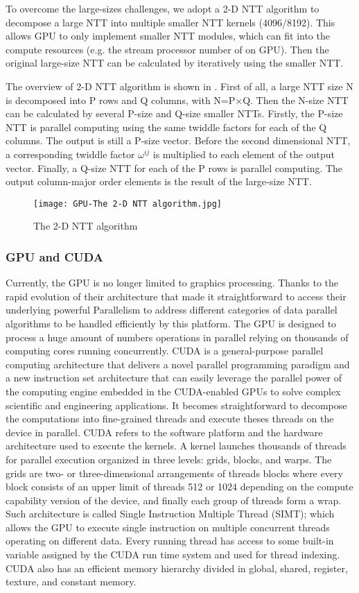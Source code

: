 To overcome the large-sizes challenges, we adopt a 2-D NTT algorithm to decompose a large NTT into multiple smaller NTT kernels (4096/8192). This allows GPU to only implement smaller NTT modules, which can fit into the compute resources (e.g. the stream processor number of on GPU). Then the original large-size NTT can be calculated by iteratively using the smaller NTT.

The overview of 2-D NTT algorithm is shown in . First of all, a large NTT size N is decomposed into P rows and Q columns, with N=P×Q. Then the N-size NTT can be calculated by several P-size and Q-size smaller NTTs. Firstly, the P-size NTT is parallel computing using the same twiddle factors for each of the Q columns. The output is still a P-size vector. Before the second dimensional NTT, a corresponding twiddle factor $\omega^{ij}$ is multiplied to each element of the output vector. Finally, a Q-size NTT for each of the P rows is parallel computing. The output column-major order elements is the result of the large-size NTT.
\begin{figure}[!ht]
    \centering
    \texttt{[image: GPU-The 2-D NTT algorithm.jpg]}
    \caption{The 2-D NTT algorithm}
    \label{fig:The 2-D NTT Algorithm}
\end{figure}
\subsubsection{GPU and CUDA}
Currently, the GPU is no longer limited to graphics processing. Thanks to the rapid evolution of their architecture that made it straightforward to access their underlying powerful Parallelism to address different categories of data parallel algorithms to be handled efficiently by this platform. The GPU is designed to process a huge amount of numbers operations in parallel relying on thousands of computing cores running concurrently. CUDA is a general-purpose parallel computing architecture that delivers a novel parallel programming paradigm and a new instruction set architecture that can easily leverage the parallel power of the computing engine embedded in the CUDA-enabled GPUs to solve complex scientific and engineering applications. It becomes straightforward to decompose the computations into fine-grained threads and execute theses threads on the device in parallel. CUDA refers to the software platform and the hardware architecture used to execute the kernels. A kernel launches thousands of threads for parallel execution organized in three levels: grids, blocks, and warps. The grids are two- or three-dimensional arrangements of threads blocks where every block consists of an upper limit of threads 512 or 1024 depending on the compute capability version of the device, and finally each group of threads form a wrap. Such architecture is called Single Instruction Multiple Thread (SIMT); which allows the GPU to execute single instruction on multiple concurrent threads operating on different data. Every running thread has access to some built-in variable assigned by the CUDA run time system and used for thread indexing. CUDA also has an efficient memory hierarchy divided in global, shared, register, texture, and constant memory.
